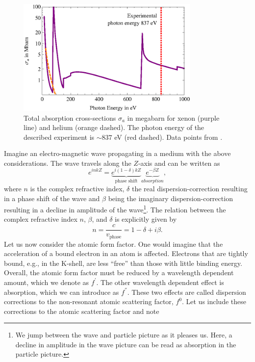 \begin{figure}
	\centering
		\includegraphics[width=0.80\textwidth]{images/photoionization.eps}
	\caption[Total absorption cross-sections for helium and xenon.]{Total absorption cross-sections $\sigma_{a}$ in megabarn for xenon (purple line) and helium (orange dashed). The photon energy of the described experiment is $\sim 837$ eV (red dashed). Data points from \citep{Elettra-2016-Website,Yeh-1985-AtmDat,Yeh-1993-GBSP}.}
	\label{fig:photoionization}
\end{figure}
 Imagine an electro-magnetic wave propagating in a medium with the above considerations. The wave travels along the $Z$-axis and can be written as \citep{Als-Nielson-2011-JWS,Attwood-2007-CUP}
\begin{equation}
e^{i n k Z}= \underbrace{e^{i \left(1-\delta\right)k Z}}_{\text{phase shift}}\underbrace{e^{-\beta Z}}_{absorption},
\label{eq:wave-in-medium}
\end{equation}
where $n$ is the complex refractive index, $\delta$ the real dispersion-correction resulting in a phase shift of the wave and $\beta$ being the imaginary dispersion-correction resulting in a decline in amplitude of the wave\footnote{We jump between the wave and particle picture as it pleases us. Here, a decline in amplitude in the wave picture can be read as absorption in the particle picture.}. The relation between the complex refractive index $n$, $\beta$, and $\delta$ is explicitly given by
\begin{equation}
n=\frac{c}{v_{\text{phase}}}=1-\delta+i\beta.
\label{eq:complex-refractive-index}
\end{equation}
Let us now consider the atomic form factor. One would imagine that the acceleration of a bound electron in an atom is affected. Electrons that are tightly bound, e.g., in the K-shell, are less ``free'' than those with little binding energy. Overall, the atomic form factor must be reduced by a wavelength dependent amount, which we denote as $f^{'}$. The other wavelength dependent effect is absorption, which we can introduce as $f^{''}$. These two effects are called dispersion corrections to the non-resonant atomic scattering factor, $f^{0}$. Let us include these corrections to the atomic scattering factor and note
